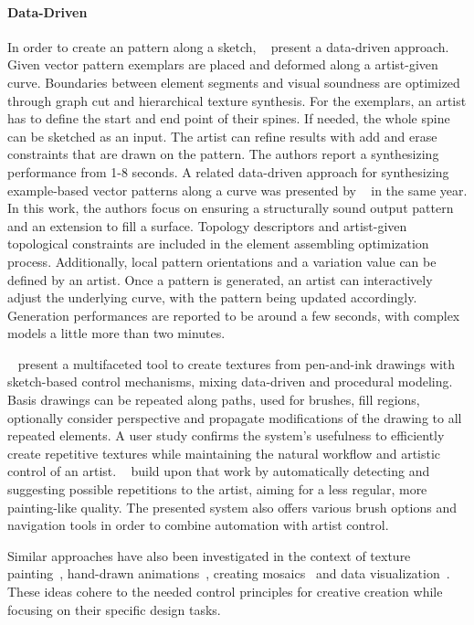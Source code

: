 \paragraph*{Data-Driven}
\label{para:analysis_rulebased_sketchbased_datadriven}
In order to create an pattern along a sketch, \citeauthor*{lu_2014_dds}~\cite{lu_2014_dds} present a data-driven approach. Given vector pattern exemplars are placed and deformed along a artist-given curve. Boundaries between element segments and visual soundness are optimized through graph cut and hierarchical texture synthesis. For the exemplars, an artist has to define the start and end point of their spines. If needed, the whole spine can be sketched as an input. The artist can refine results with add and erase constraints that are drawn on the pattern. The authors report a synthesizing performance from 1-8 seconds. A related data-driven approach for synthesizing example-based vector patterns along a curve was presented by \citeauthor*{zhou_2014_tsv}~\cite{zhou_2014_tsv} in the same year. In this work, the authors focus on ensuring a structurally sound output pattern and an extension to fill a surface. Topology descriptors and artist-given topological constraints are included in the element assembling optimization process. Additionally, local pattern orientations and a variation value can be defined by an artist. Once a pattern is generated, an artist can interactively adjust the underlying curve, with the pattern being updated accordingly. Generation performances are reported to be around a few seconds, with complex models a little more than two minutes.

\citeauthor*{kazi_2012_vit}~\cite{kazi_2012_vit} present a multifaceted tool to create textures from pen-and-ink drawings with sketch-based control mechanisms, mixing data-driven and procedural modeling. Basis drawings can be repeated along paths, used for brushes, fill regions, optionally consider perspective and propagate modifications of the drawing to all repeated elements. A user study confirms the system's usefulness to efficiently create repetitive textures while maintaining the natural workflow and artistic control of an artist. \citeauthor*{xing_2014_apr}~\cite{xing_2014_apr} build upon that work by automatically detecting and suggesting possible repetitions to the artist, aiming for a less regular, more painting-like quality. The presented system also offers various brush options and navigation tools in order to combine automation with artist control.

Similar approaches have also been investigated in the context of texture painting~\cite{lukac_2013_pft}, hand-drawn animations~\cite{xing_2015_aha}, creating mosaics~\cite{igarashi_2010_dde,abdrashitov_2014_msi} and data visualization~\cite{xia_2018_ddc}. These ideas cohere to the needed control principles for creative creation while focusing on their specific design tasks. 

